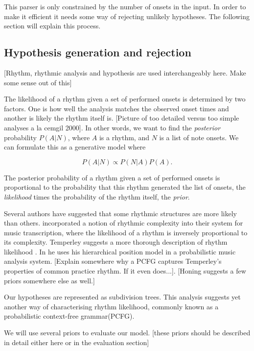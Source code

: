 This parser is only constrained by the number of onsets in the input. In order to make it efficient it needs some way of rejecting unlikely hypotheses. The following section will explain this process.


\subsection{Hypothesis generation and rejection}

[Rhythm, rhythmic analysis and hypothesis are used interchangeably here. Make some sense out of this]

The likelihood of a rhythm given a set of performed onsets is determined by two factors. One is how well the analysis matches the observed onset times and another is likely the rhythm itself is. [Picture of too detailed versus too simple analyses a la cemgil 2000]. In other words, we want to find the \textit{posterior} probability $P(A|N)$, where $A$ is a rhythm, and $N$ is a list of note onsets. We can formulate this as a generative model where

\begin{equation}
\label{eq:model}
P(A|N) \propto P(N|A)P(A).
\end{equation}

The posterior probability of a rhythm given a set of performed onsets is proportional to the probability that this rhythm generated the list of onsets, the \textit{likelihood} times the probability of the rhythm itself, the \textit{prior}.

Several authors have suggested that some rhythmic structures are more likely than others. \cite{cemgil2000rhythm} incorporated a notion of rhythmic complexity into their system for music transcription, where the likelihood of a rhythm is inversely proportional to its complexity. Temperley suggests a more thorough description of rhythm likelihood \citep{temperley2010modeling}. In \cite{temperley2009unified} he uses his hierarchical position model in a probabilistic music analysis system. [Explain somewhere why a PCFG captures Temperley's properties of common practice rhythm. If it even does...]. [Honing suggests a few priors somewhere else as well.]

Our hypotheses are represented as subdivision trees. This analysis suggests yet another way of characterising rhythm likelihood, commonly known as a probabilistic context-free grammar(PCFG). 

We will use several priors to evaluate our model. [these priors should be described in detail either here or in the evaluation section]

